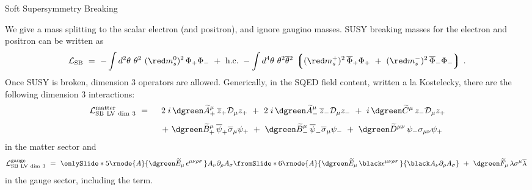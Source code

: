 \documentclass[pdf,PItalk,slideColor,colorBG,accumulate]{prosper}
\newcommand{\wt}{\widetilde}
\begin{document}

{
\begin{slide}{ Soft Supersymmetry Breaking }
{
}

	We give a mass splitting to the scalar electron (and positron),
	and ignore gaugino masses.
	SUSY breaking masses for the electron and positron can be 
	written as
\begin{equation*}
  \mathcal{L}_{\rm SB} ~=~  
- \int d^2\theta ~ \theta^2~ 
({\red m_{s}^0})^2 \, \Phi_+ \Phi_-
~+~ \text{h.c.} 
~- \int d^4\theta ~
\theta^2\overline{\theta}{}^2~ 
\Big\lgroup 
({\red m_s^+})^2\, \overline{\Phi}_+ \Phi_+ 
~+~
({\red m_s^-})^2\, \overline{\Phi}_- \Phi_-
\Big\rgroup  
~. 
\end{equation*}
%
	Once SUSY is broken, dimension 3 operators are allowed.
	Generically, in the SQED field content, written a la
	Kostelecky, there are the following dimension 3 interactions:
%
\begin{eqnarray*}
{\cal L}_{\rm SB~LV~dim~3}^{\rm matter} 
&~=~& 
2\;i\, {\dgreen \wt{A}_+^\mu}\, \overline{z}_+ \mathcal{D}_\mu z_+ 
~+~ 2\;i\, {\dgreen \wt{A}_-^\mu}\, \overline{z}_-\mathcal{D}_\mu z_- 
~+~i\, {\dgreen \wt{C}^\mu}\, z_- \mathcal{D}_\mu z_+ 
\\[1ex] 
\nonumber
&& 
~+~{\dgreen \wt{B}_+^\mu}\, \overline{\psi}_+\overline{\sigma}_\mu \psi_+ 
~+~ {\dgreen \wt{B}_-^\mu}\, \overline{\psi}_-\overline{\sigma}_\mu \psi_-
 ~+~{\dgreen \wt{D}^{\mu\nu}}\, \psi_- \sigma_{\mu\nu} \psi_+~
\end{eqnarray*}
%
	in the matter sector and 
\begin{eqnarray*}
{\cal L}_{\rm SB~LV~dim~3}^{\rm gauge} ~=~ 
\onlySlide*{5}{
	\rnode{A}{
	{\dgreen \wt{E}_\mu}\, \epsilon^{\mu\nu\rho\sigma}\, 
	}
	A_\nu \partial_\rho A_\sigma  
}
\fromSlide*{6}{
	\rnode{A}{
	{\dgreen \wt{E}_\mu}\, {\black \epsilon^{\mu\nu\rho\sigma}}\, 
	}
	{\black A_\nu \partial_\rho A_\sigma}
}
~+~ 
{\dgreen \wt{F}_\mu}\, \lambda \sigma^\mu \overline{\lambda} 
~
\end{eqnarray*}
%
	in the gauge sector, 
	including the  term.

\end{slide}
}
\end{document}
